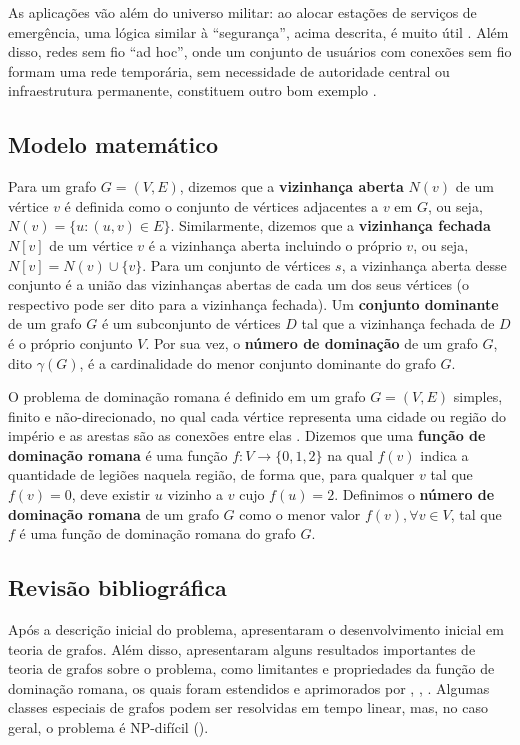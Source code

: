 \documentclass[11pt]{article}
\begin{document}
As aplicações vão além do universo militar: ao alocar estações de serviços de emergência, uma lógica similar à ``segurança'', acima descrita, é muito útil \autocite{GhaffariHadigheh2019Romandominationproblem}.
Além disso, redes sem fio ``ad hoc'', onde um conjunto de usuários com conexões sem fio formam uma rede temporária, sem necessidade de autoridade central ou infraestrutura permanente, constituem outro bom exemplo \autocite{Wu2000Dominationitsapplications}.


\subsection{Modelo matemático}
\label{sec:org4e644aa}
Para um grafo \(G = (V, E)\), dizemos que a \textbf{vizinhança aberta} \(N(v)\) de um vértice \(v\) é definida como o conjunto de vértices adjacentes a \(v\) em \(G\), ou seja, \(N(v) = \{u : (u, v) \in E\}\).
Similarmente, dizemos que a \textbf{vizinhança fechada} \(N[v]\) de um vértice \(v\) é a vizinhança aberta incluindo o próprio \(v\), ou seja, \(N[v] = N(v) \cup \{v\}\).
Para um conjunto de vértices \(s\), a vizinhança aberta desse conjunto é a união das vizinhanças abertas de cada um dos seus vértices (o respectivo pode ser dito para a vizinhança fechada).
Um \textbf{conjunto dominante} de um grafo \(G\) é um subconjunto de vértices \(D\) tal que a vizinhança fechada de \(D\) é o próprio conjunto \(V\).
Por sua vez, o \textbf{número de dominação} de um grafo \(G\), dito \(\gamma(G)\), é a cardinalidade do menor conjunto dominante do grafo \(G\).

O problema de dominação romana é definido em um grafo \(G = (V, E)\) simples, finito e não-direcionado, no qual cada vértice representa uma cidade ou região do império e as arestas são as conexões entre elas \autocite{Cockayne2004Romandominationgraphs}.
Dizemos que uma \textbf{função de dominação romana} é uma função \(f : V \to \{0, 1, 2\}\) na qual \(f(v)\) indica a quantidade de legiões naquela região, de forma que, para qualquer \(v\) tal que \(f(v) = 0\), deve existir \(u\) vizinho a \(v\) cujo \(f(u) = 2\).
Definimos o \textbf{número de dominação romana} de um grafo \(G\) como o menor valor \(f(v), \forall v \in V\), tal que \(f\) é uma função de dominação romana do grafo \(G\).

\subsection{Revisão bibliográfica}
\label{sec:org86e3ee6}
Após a descrição inicial do problema, \textcite{ReVelle2000DefendensImperiumRomanum} apresentaram o desenvolvimento inicial em teoria de grafos.
Além disso, \textcite{Cockayne2004Romandominationgraphs} apresentaram alguns resultados importantes de teoria de grafos sobre o problema, como limitantes e propriedades da função de dominação romana, os quais foram estendidos e aprimorados por \textcite{Xing2006noteRomandomination}, \textcite{Favaron2009Romandominationnumber}, \textcite{Mobaraky2008BoundsRomanDomination}.
Algumas classes especiais de grafos podem ser resolvidas em tempo linear, mas, no caso geral, o problema é NP-difícil (\autocite{Dreyer2000Applicationsvariationsdomination,Klobucar2014SomeresultsRoman,Shang2007RomanDominationProblem}).
\end{document}
